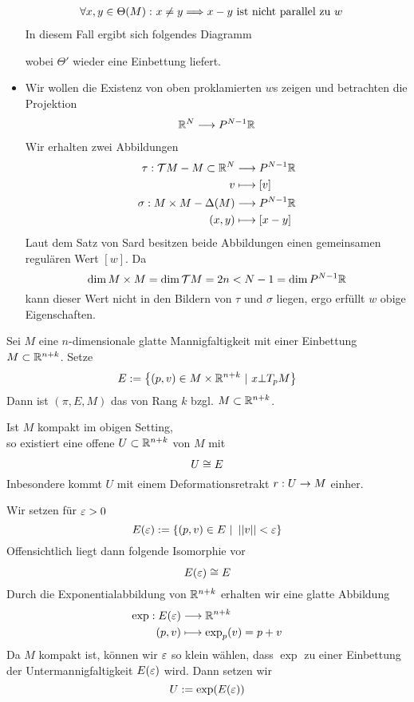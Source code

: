\begin{Beweis}{}
\begin{itemize}
\begin{align*}
	\forall x,y \in \Theta(M):~& x\neq y \overset{}{\Longrightarrow} x-y \text{ ist nicht parallel zu } w
	\end{align*}
	In diesem Fall ergibt sich folgendes Diagramm
	\begin{center}
	\end{center}
wobei $\Theta'$ wieder eine Einbettung liefert.
\item Wir wollen die Existenz von oben proklamierten $w$s zeigen und betrachten die Projektion
\begin{align*}
\mathbb{R}^N \overset{}{\longrightarrow} P^{N-1}\mathbb{R}
\end{align*}
Wir erhalten zwei Abbildungen
\begin{align*}
\tau : \mathcal{T} M - M \subset \mathbb{R}^N & \overset{}{\longrightarrow} P^{N-1}\mathbb{R}\\
v & \longmapsto [v]\\
\sigma : M\times M - \Delta(M) & \overset{}{\longrightarrow} P^{N-1}\mathbb{R}\\
(x,y) & \longmapsto [x-y]
\end{align*}
Laut dem Satz von Sard besitzen beide Abbildungen einen gemeinsamen regulären Wert $[w]$. Da
\[ \dim M\times M= \dim \mathcal{T} M = 2n< N-1 = \dim P^{N-1}\mathbb{R} \]
kann dieser Wert nicht in den Bildern von $\tau$ und $\sigma$ liegen, ergo erfüllt $w$ obige Eigenschaften.
\end{itemize}
\end{Beweis}

\Def{}
Sei $M$ eine $n$-dimensionale glatte Mannigfaltigkeit mit einer Einbettung $M \subset \mathbb{R}^{n+k}$. Setze
\[ E:= \set{ (p,v) \in M\times \R^{n+k} }{ x\bot T_pM } \]
Dann ist $(\pi, E, M)$ das  von Rang $k$ bzgl. $M \subset \mathbb{R}^{n+k}$.

Ist $M$ kompakt im obigen Setting,\\
so existiert eine offene  $U\subset \mathbb{R}^{n+k}$ von $M$ mit
\[ U \overset{}{\cong} E \]
Inbesondere kommt $U$ mit einem Deformationsretrakt $r : U \overset{}{\rightarrow} M$ einher.
\begin{Beweis}{}
Wir setzen für $\varepsilon > 0$
\[ E(\e) := \set{(p,v) \in E}{\norm{v}< \epsilon} \]
Offensichtlich liegt dann folgende Isomorphie vor
\[ E(\varepsilon) \overset{}{\cong} E \]
Durch die Exponentialabbildung von $\mathbb{R}^{n+k}$ erhalten wir eine glatte Abbildung
\begin{align*}
\exp : E(\varepsilon) & \overset{}{\longrightarrow} \mathbb{R}^{n+k}\\
(p,v) & \longmapsto \exp_p(v) = p +v 
\end{align*}
Da $M$ kompakt ist, können wir $\varepsilon$ so klein wählen, dass $\exp$ zu einer Einbettung der Untermannigfaltigkeit $E(\varepsilon)$ wird. Dann setzen wir
\[ U:= \exp(E(\varepsilon)) \]
\end{Beweis}